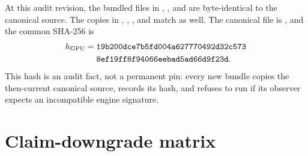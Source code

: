 \documentclass[aps,prx,twocolumn,floatfix,nofootinbib,superscriptaddress,longbibliography]{revtex4-2}
\newcommand{\code}[1]{\texttt{#1}}
\begin{document}
At this audit revision, the bundled  files in
, , and
 are byte-identical to the canonical source.  The copies
in , ,
, and 
match as well.  The canonical file is , and the common
SHA-256 is
\begin{equation}
\begin{split}
 h_{\rm GPU}={}&\code{19b200dce7b5fd004a627770492d32c573}\\
               &\code{8ef19ff8f94066eebad5ad66d9f23d}.
\end{split}
\end{equation}
This hash is an audit fact, not a permanent pin: every new bundle copies the then-current
canonical source, records its hash, and refuses to run if its observer expects an
incompatible engine signature.

\section{Claim-downgrade matrix}
\end{document}
